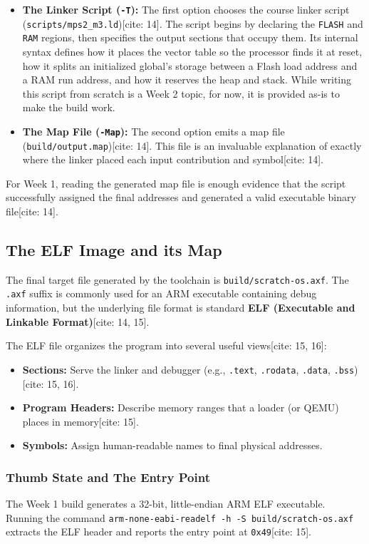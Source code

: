 \begin{itemize}
    \item \textbf{The Linker Script (\texttt{-T}):} The first option chooses the course linker script (\texttt{scripts/mps2\_m3.ld})[cite: 14]. The script begins by declaring the \texttt{FLASH} and \texttt{RAM} regions, then specifies the output sections that occupy them. Its internal syntax defines how it places the vector table so the processor finds it at reset, how it splits an initialized global's storage between a Flash load address and a RAM run address, and how it reserves the heap and stack. While writing this script from scratch is a Week 2 topic, for now, it is provided as-is to make the build work.
    \item \textbf{The Map File (\texttt{-Map}):} The second option emits a map file (\texttt{build/output.map})[cite: 14]. This file is an invaluable explanation of exactly where the linker placed each input contribution and symbol[cite: 14]. 
\end{itemize}

For Week 1, reading the generated map file is enough evidence that the script successfully assigned the final addresses and generated a valid executable binary file[cite: 14].

\subsection{The ELF Image and its Map}
The final target file generated by the toolchain is \texttt{build/scratch-os.axf}. The \texttt{.axf} suffix is commonly used for an ARM executable containing debug information, but the underlying file format is standard \textbf{ELF (Executable and Linkable Format)}[cite: 14, 15]. 

The ELF file organizes the program into several useful views[cite: 15, 16]:
\begin{itemize}
    \item \textbf{Sections:} Serve the linker and debugger (e.g., \texttt{.text}, \texttt{.rodata}, \texttt{.data}, \texttt{.bss})[cite: 15, 16].
    \item \textbf{Program Headers:} Describe memory ranges that a loader (or QEMU) places in memory[cite: 15].
    \item \textbf{Symbols:} Assign human-readable names to final physical addresses.
\end{itemize}

\subsubsection{Thumb State and The Entry Point}
The Week 1 build generates a 32-bit, little-endian ARM ELF executable. Running the command \texttt{arm-none-eabi-readelf -h -S build/scratch-os.axf} extracts the ELF header and reports the entry point at \texttt{0x49}[cite: 15]. 

